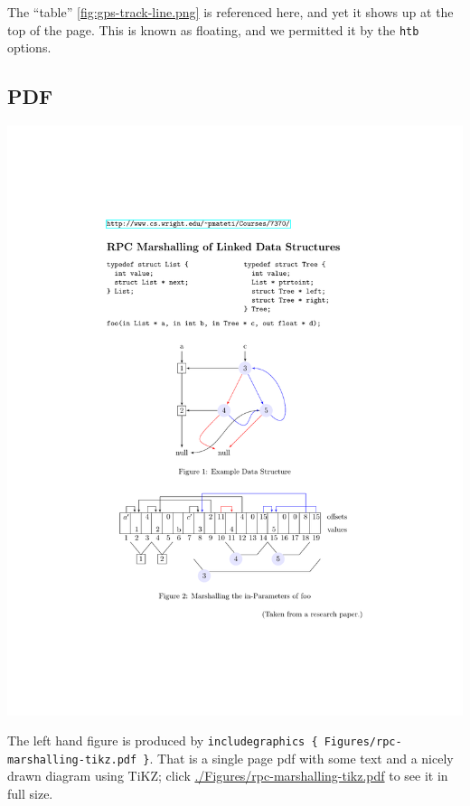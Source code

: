 The ``table'' \ref{fig:gps-track-line.png} is referenced here, and yet
it shows up at the top of the page.  This is known as floating, and we
permitted it by the {\tt htb} options.

\subsection{PDF}

\begin{minipage}{5.0cm}
\includegraphics[scale=0.25]{Figures/rpc-marshalling-tikz.pdf}
\end{minipage}
\quad
\quad
\begin{minipage}{5.0cm}
  The left hand figure is produced by {\tt includegraphics \{
    Figures/rpc-marshalling-tikz.pdf \}}.  That is a single page pdf
  with some text and a nicely drawn diagram using TiKZ; click
  \url{./Figures/rpc-marshalling-tikz.pdf} to see it in full size.
\end{minipage}

